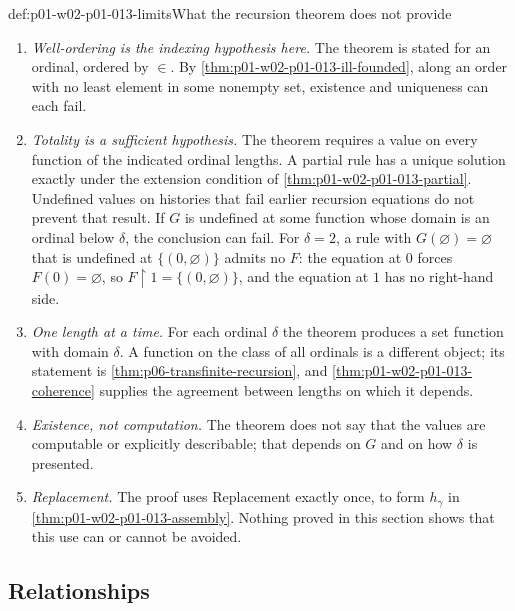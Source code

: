 \begin{hbwarning}{def:p01-w02-p01-013-limits}{What the recursion theorem does not provide}
\begin{enumerate}
  \item \emph{Well-ordering is the indexing hypothesis here.} The theorem is stated for
        an ordinal, ordered by \(\in\). By
        \cref{thm:p01-w02-p01-013-ill-founded}, along an order with no least
        element in some nonempty set, existence and uniqueness can each fail.
  \item \emph{Totality is a sufficient hypothesis.} The theorem requires a
        value on every function of the indicated ordinal lengths. A partial
        rule has a unique solution exactly under the extension condition of
        \cref{thm:p01-w02-p01-013-partial}. Undefined values on histories
        that fail earlier recursion equations do not prevent that result.
        If \(G\) is
        undefined at some function whose domain is an ordinal below
        \(\delta\), the conclusion can fail. For \(\delta=2\), a rule with
        \(G(\varnothing)=\varnothing\) that is undefined at
        \(\{(0,\varnothing)\}\) admits no \(F\): the equation at \(0\) forces
        \(F(0)=\varnothing\), so \(F\mathbin{\upharpoonright}1=\{(0,\varnothing)\}\),
        and the equation at \(1\) has no right-hand side.
  \item \emph{One length at a time.} For each ordinal \(\delta\) the theorem
        produces a set function with domain \(\delta\). A function on the
        class of all ordinals is a different object; its statement is
        \cref{thm:p06-transfinite-recursion}, and
        \cref{thm:p01-w02-p01-013-coherence} supplies the agreement between
        lengths on which it depends.
  \item \emph{Existence, not computation.} The theorem does not say that the
        values are computable or explicitly describable; that depends on
        \(G\) and on how \(\delta\) is presented.
  \item \emph{Replacement.} The proof uses Replacement exactly once, to form
        \(h_\gamma\) in \cref{thm:p01-w02-p01-013-assembly}. Nothing proved
        in this section shows that this use can or cannot be avoided.
\end{enumerate}
\end{hbwarning}

\subsection{Relationships}
\label{sec:p01-w02-p01-013-relationships}

